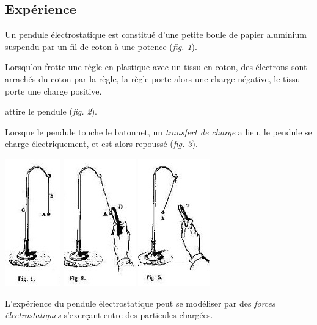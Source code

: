 
\subsection{Expérience}
Un pendule électrostatique est constitué d'une petite boule de papier aluminium suspendu par un fil de coton à une potence ({\it fig. 1}).
 
Lorsqu'on frotte une règle en plastique avec un tissu en coton, des électrons sont arrachés du coton par la règle, la règle porte alors une charge négative, le tissu porte une charge positive.

attire le pendule ({\it fig. 2}).


Lorsque le pendule touche le batonnet, un {\it transfert de charge} a lieu, le pendule se charge électriquement, et est alors repoussé ({\it fig. 3}).

\begin{center}
\includegraphics[scale=0.9]{./forces/Mascart01}
\hspace{0.3cm}
\includegraphics[scale=0.9]{./forces/Mascart02}
\hspace{0.3cm}
\includegraphics[scale=0.9]{./forces/Mascart03}
\end{center}

L'expérience du pendule électrostatique peut se modéliser par des {\it forces électrostatiques} s'exerçant entre des particules chargées.

